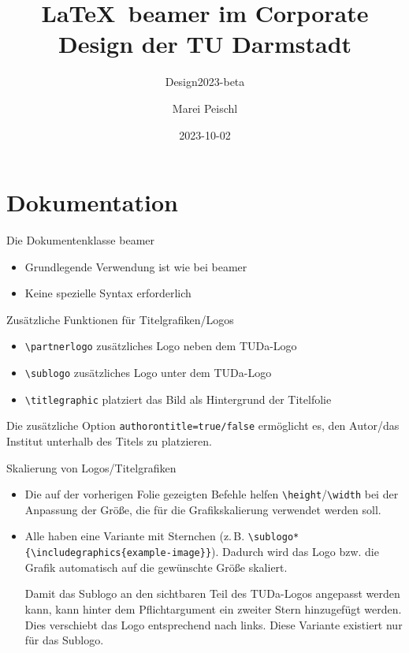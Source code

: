 \documentclass[
	ngerman,%
	accentcolor=9c,%
]{tudabeamer}
\title[TUDaBeamer2023]{\LaTeX~beamer im Corporate Design der TU Darmstadt}
\subtitle{Design2023-beta}
\author[M. Peischl]{Marei Peischl}
\institute{pei\TeX}
\date{2023-10-02}%
\newcommand*{\code}[1]{\texttt{#1}}
\begin{document}
\maketitle

\tableofcontents

\section{Dokumentation}

\begin{frame}{Die Dokumentenklasse beamer}
	\begin{itemize}
		\item Grundlegende Verwendung ist wie bei beamer
		\item Keine spezielle Syntax erforderlich
	\end{itemize}
\end{frame}

\begin{frame}{Zusätzliche Funktionen für Titelgrafiken/Logos}
	\begin{itemize}
		\item \code{\textbackslash{}partnerlogo} zusätzliches Logo neben dem TUDa-Logo
		\item \code{\textbackslash{}sublogo} zusätzliches Logo unter dem TUDa-Logo
		\item \code{\textbackslash{}titlegraphic} platziert das Bild als Hintergrund der Titelfolie
	\end{itemize}
	Die zusätzliche Option \code{authorontitle=true/false} ermöglicht es, den Autor/das Institut unterhalb des Titels zu platzieren.
\end{frame}

\begin{frame}{Skalierung von Logos/Titelgrafiken}
	\begin{itemize}
		\item Die auf der vorherigen Folie gezeigten Befehle helfen \code{\textbackslash{}height}/\code{\textbackslash{}width} bei der Anpassung der Größe, die für die Grafikskalierung verwendet werden soll.
		\item Alle haben eine Variante mit Sternchen (z.\,B. \code{\textbackslash{}sublogo*\{\textbackslash{}includegraphics\{example-image\}\}}). Dadurch wird das Logo bzw. die Grafik automatisch auf die gewünschte Größe skaliert.

		      Damit das Sublogo an den sichtbaren Teil des TUDa-Logos angepasst werden kann, kann hinter dem Pflichtargument ein zweiter Stern hinzugefügt werden. Dies verschiebt das Logo entsprechend nach links. Diese Variante existiert nur für das Sublogo.
	\end{itemize}
\end{frame}
\end{document}
